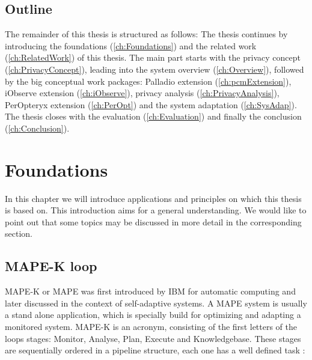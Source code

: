 \section{Outline}
\label{sec:Introduction:outline}

The remainder of this thesis is structured as follows: The thesis continues by introducing the foundations (\autoref{ch:Foundations}) and the related work (\autoref{ch:RelatedWork}) of this thesis. The main part starts with the privacy concept (\autoref{ch:PrivacyConcept}), leading into the system overview (\autoref{ch:Overview}), followed by the big conceptual work packages: Palladio extension (\autoref{ch:pcmExtension}), iObserve extension (\autoref{ch:iObserve}), privacy analysis (\autoref{ch:PrivacyAnalysis}), PerOpteryx extension (\autoref{ch:PerOpt}) and the system adaptation (\autoref{ch:SysAdap}). The thesis closes with the evaluation (\autoref{ch:Evaluation}) and finally the conclusion (\autoref{ch:Conclusion}).



\chapter{Foundations}
\label{ch:Foundations}

In this chapter we will introduce applications and principles on which this thesis is based on. This introduction aims for a general understanding. We would like to point out that some topics may be discussed in more detail in the corresponding section.

\section{MAPE-K loop}
\label{sec:Foundations:mape}

MAPE-K or MAPE was first introduced by IBM for automatic computing and later discussed in the context of self-adaptive systems. A MAPE system is usually a stand alone application, which is specially build for optimizing and adapting a monitored system. MAPE-K is an acronym, consisting of the first letters of the loops stages: Monitor, Analyse, Plan, Execute and Knowledgebase. These stages are sequentially ordered in a pipeline structure, each one has a well defined task \cite{Dar.2012}:

